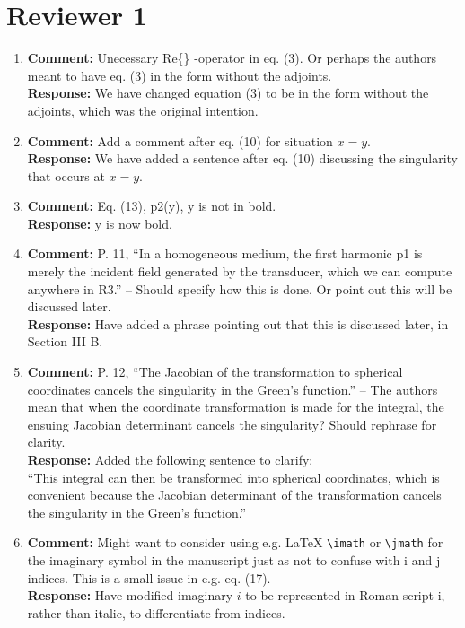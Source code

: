 \documentclass[11pt]{article}
\begin{document}
\section*{Reviewer 1}
\begin{enumerate}
	\item \textbf{Comment:} Unecessary Re\{\} -operator in eq. (3). Or perhaps the authors meant to have eq. (3) in the form without the adjoints.\\
	\textbf{Response:} We have changed equation (3) to be in the form without the adjoints,
	which was the original intention.
	
	\item \textbf{Comment:} Add a comment after eq. (10) for situation $x = y$.\\
	\textbf{Response:} We have added a sentence after eq. (10) discussing the singularity that occurs at $x=y$.
	
	\item \textbf{Comment:} Eq. (13), p2(y), y is not in bold.\\
	\textbf{Response:} y is now bold.
	
	\item \textbf{Comment:} P. 11, ``In a homogeneous medium, the first harmonic 
	p1 is merely the incident field generated by the transducer, which we can 
	compute anywhere in R3.'' -- Should specify how this is done. Or point out 
	this will be discussed later.\\
	\textbf{Response:} Have added a phrase pointing out that this is discussed 
	later, in Section III B.
	
	\item \textbf{Comment:} P. 12, ``The Jacobian of the transformation to spherical coordinates 
	cancels the singularity in the Green's function.'' -- The authors mean that 
	when the coordinate transformation is made for the integral, the ensuing 
	Jacobian determinant cancels the singularity? Should rephrase for clarity. \\
	\textbf{Response:} Added the following sentence to clarify:\\
	``This integral can then be transformed into spherical coordinates, 
which is convenient because the Jacobian determinant of the transformation cancels
the singularity in the Green's function.''
	
\item \textbf{Comment:} Might want to consider using e.g. LaTeX \verb!\imath!
	 or \verb!\jmath! for the imaginary symbol in the manuscript just as not to 
	 confuse with i and j indices. This is a small issue in e.g. eq. (17). \\
	 \textbf{Response:} Have modified imaginary $i$ to be represented in Roman 
	 script i, rather than italic, to differentiate from indices.
	 

\end{enumerate}
\end{document}

